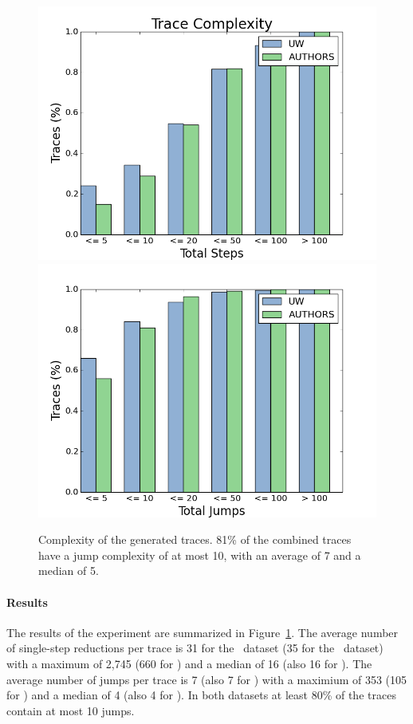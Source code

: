 %
\begin{figure}[t]
\centering
\includegraphics[width=\linewidth]{trace_size_step.png}
\includegraphics[width=\linewidth]{trace_size_jump.png}
\caption{Complexity of the generated traces. 81\% of the combined traces
  have a jump complexity of at most 10, with an average of 7 and a
  median of 5.}
\label{fig:results-complexity}
\end{figure}
%

\paragraph{Results}
\label{sec:results-complexity}
The results of the experiment are summarized in
Figure~\ref{fig:results-complexity}.
%
The average number of single-step reductions per trace is 31 for the
\ucsdbench\ dataset (35 for the \uwbench\ dataset) with a maximum of
2,745 (660 for \uwbench) and a median of 16 (also 16 for \uwbench).
%
The average number of jumps per trace is 7 (also 7 for \uwbench) with a
maximium of 353 (105 for \uwbench) and a median of 4 (also 4 for
\uwbench).
%
In both datasets at least 80\% of the traces contain at most 10 jumps.
%

